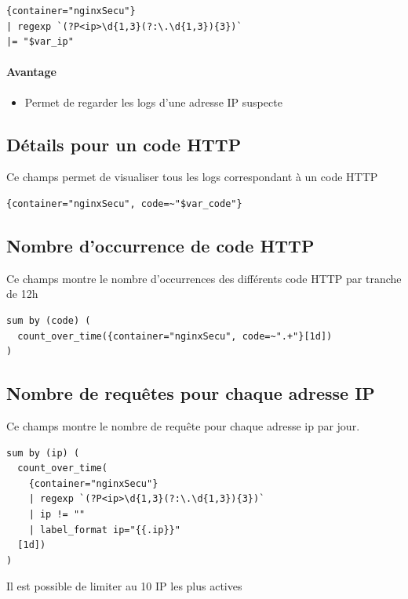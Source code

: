 \documentclass[french, 12pt]{article}%
\newcommand{\itemE}{\item[$\bullet$]}
\begin{document}
\begin{lstlisting}[style=commande]
{container="nginxSecu"}
| regexp `(?P<ip>\d{1,3}(?:\.\d{1,3}){3})`
|= "$var_ip"
\end{lstlisting}

\paragraph{Avantage }
\begin{itemize}
\itemE Permet de regarder les logs d'une adresse IP suspecte
\end{itemize}

\subsection{Détails pour un code HTTP}

Ce champs permet de visualiser tous les logs correspondant à un code HTTP

\begin{lstlisting}[style=commande]
{container="nginxSecu", code=~"$var_code"}
\end{lstlisting}

\subsection{Nombre d'occurrence de code HTTP}

Ce champs montre le nombre d'occurrences des différents code HTTP par tranche de 12h

\begin{lstlisting}[style=commande]
sum by (code) (
  count_over_time({container="nginxSecu", code=~".+"}[1d])
)
\end{lstlisting}


\subsection{Nombre de requêtes pour chaque adresse IP}

Ce champs montre le nombre de requête pour chaque adresse ip par jour.

\begin{lstlisting}[style=commande]
sum by (ip) (
  count_over_time(
    {container="nginxSecu"}
    | regexp `(?P<ip>\d{1,3}(?:\.\d{1,3}){3})`
    | ip != ""
    | label_format ip="{{.ip}}"
  [1d])
)
\end{lstlisting}


\vspace{0.5cm}
Il est possible de limiter au 10 IP les plus actives
\end{document}
